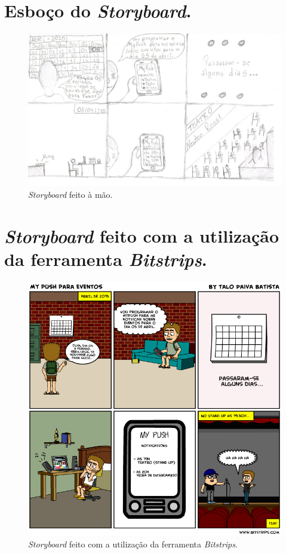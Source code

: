 \begin{apendicesenv}

\partapendices

\chapter{Esboço do \textit{Storyboard}.}

 \begin{figure}[!htbp]
    \centering
    \includegraphics[scale=0.2]{editaveis/figuras/storyboard_papel}
    \caption{\textit{Storyboard} feito à mão.}
    \label{storyboard_papel}
  \end{figure}

\chapter{\textit{Storyboard} feito com a utilização da ferramenta \textit{Bitstrips}.}

 \begin{figure}[!htbp]
    \centering
    \includegraphics[scale=0.5]{editaveis/figuras/storyboard_ferramenta}
    \caption{\textit{Storyboard} feito com a utilização da ferramenta \textit{Bitstrips}.}
    \label{storyboard_ferramenta}
  \end{figure}


\end{apendicesenv}
